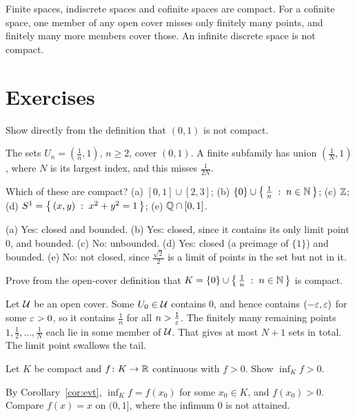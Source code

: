 \begin{example}
Finite spaces, indiscrete spaces and cofinite spaces are compact. For a cofinite space, one member of any open cover misses only finitely many points, and finitely many more members cover those. An infinite discrete space is not compact.
\end{example}

\section{Exercises}
\begin{exercise}\easy
Show directly from the definition that $(0,1)$ is not compact.
\end{exercise}
\begin{solution}
The sets $U_n=(\frac1n,1)$, $n\ge2$, cover $(0,1)$. A finite subfamily has union $(\frac1N,1)$, where $N$ is its largest index, and this misses $\frac1{2N}$.
\end{solution}

\begin{exercise}\easy
Which of these are compact? (a) $[0,1]\cup[2,3]$; (b) $\{0\}\cup\left\{\, \frac1n \;:\; n\in\mathbb{N} \,\right\}$; (c) $\mathbb{Z}$; (d) $S^1=\left\{\, (x,y) \;:\; x^2+y^2=1 \,\right\}$; (e) $\mathbb{Q}\cap[0,1]$.
\end{exercise}
\begin{solution}
(a) Yes: closed and bounded. (b) Yes: closed, since it contains its only limit point $0$, and bounded. (c) No: unbounded. (d) Yes: closed (a preimage of $\{1\}$) and bounded. (e) No: not closed, since $\frac{\sqrt2}2$ is a limit of points in the set but not in it.
\end{solution}

\begin{exercise}\medium
Prove from the open-cover definition that $K=\{0\}\cup\left\{\, \frac1n \;:\; n\in\mathbb{N} \,\right\}$ is compact.
\end{exercise}
\begin{solution}
Let $\mathcal{U}$ be an open cover. Some $U_0\in\mathcal{U}$ contains $0$, and hence contains $(-\varepsilon,\varepsilon)$ for some $\varepsilon>0$, so it contains $\frac1n$ for all $n>\frac1{\varepsilon}$. The finitely many remaining points $1,\frac12,\dots,\frac1N$ each lie in some member of $\mathcal{U}$. That gives at most $N+1$ sets in total. The limit point swallows the tail.
\end{solution}

\begin{exercise}\medium
Let $K$ be compact and $f\colon K\to\mathbb{R}$ continuous with $f>0$. Show $\inf_K f>0$.
\end{exercise}
\begin{solution}
By Corollary~\ref{cor:evt}, $\inf_Kf=f(x_0)$ for some $x_0\in K$, and $f(x_0)>0$. Compare $f(x)=x$ on $(0,1]$, where the infimum $0$ is not attained.
\end{solution}

